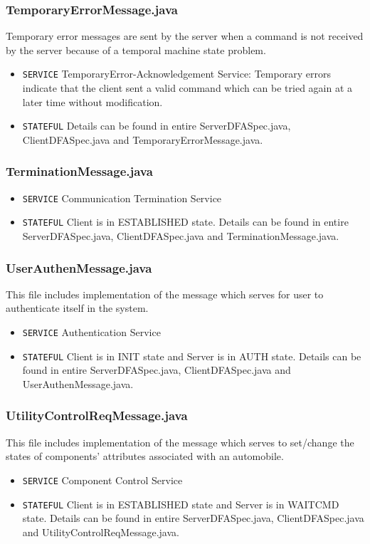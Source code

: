 \documentclass[12pt]{usenixsubmit}
\begin{document}
     \subsubsection{TemporaryErrorMessage.java}Temporary error messages are sent by the server when a command is not received by the server because of a temporal machine state problem.
     \begin{itemize}
     \item {\tt SERVICE}  TemporaryError-Acknowledgement Service: Temporary errors indicate that the client sent a valid command which can be tried again at a later time without modification.
     \item {\tt STATEFUL} Details can be found in entire ServerDFASpec.java, ClientDFASpec.java and TemporaryErrorMessage.java.
     \end{itemize}

     \subsubsection{TerminationMessage.java}
     \begin{itemize}
     \item {\tt SERVICE}  Communication Termination Service
     \item {\tt STATEFUL} Client is in ESTABLISHED state. Details can be found in entire ServerDFASpec.java, ClientDFASpec.java and TerminationMessage.java.
     \end{itemize}

     \subsubsection{UserAuthenMessage.java}This file includes implementation of the message which serves for user to authenticate itself in the system.
     \begin{itemize}
     \item {\tt SERVICE}  Authentication Service
     \item {\tt STATEFUL} Client is in INIT state and Server is in AUTH state. Details can be found in entire ServerDFASpec.java, ClientDFASpec.java and UserAuthenMessage.java.
     \end{itemize}

    \subsubsection{UtilityControlReqMessage.java}This file includes implementation of the message which serves to set/change the states of components' attributes associated with an automobile.
     \begin{itemize}
     \item {\tt SERVICE}  Component Control Service
     \item {\tt STATEFUL} Client is in ESTABLISHED state and Server is in WAITCMD state.  Details can be found in entire ServerDFASpec.java, ClientDFASpec.java and UtilityControlReqMessage.java.
     \end{itemize}
\end{document}
